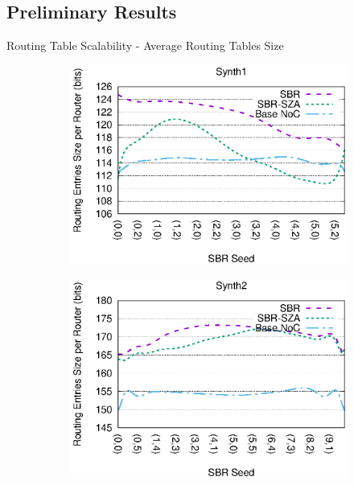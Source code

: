 \subsection{Preliminary Results}
\begin{frame}{Routing Table Scalability - Average Routing Tables Size}
	\begin{center}
		\begin{figure}
			\begin{subfigure}{0.49\linewidth}
				\includegraphics[width=1.0\linewidth]{charts/synth1/synth1-routing-tables-bits-bezier.eps}
			\end{subfigure}
			\begin{subfigure}{0.49\linewidth}
				\includegraphics[width=1.0\linewidth]{charts/synth2/synth2-routing-tables-bits-bezier.eps}

\end{subfigure}
\end{figure}
\end{center}
\end{frame}
